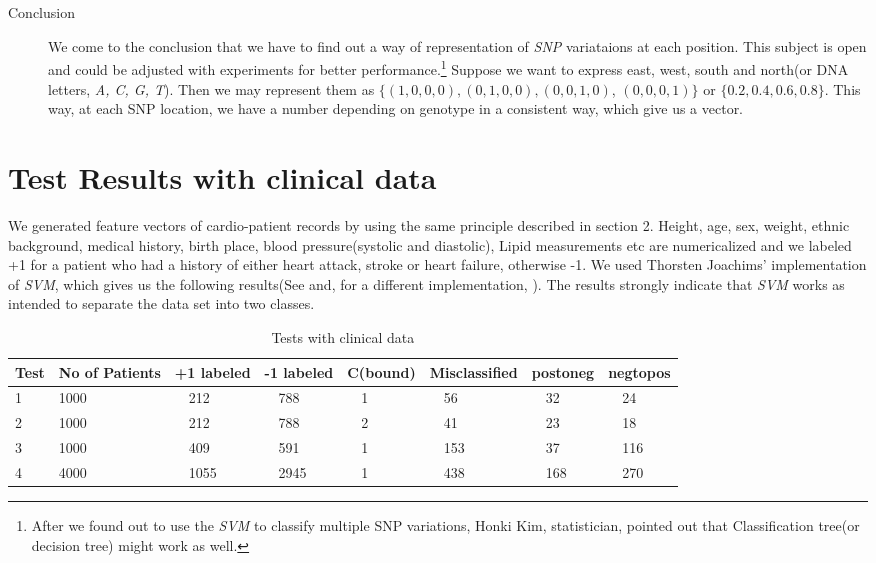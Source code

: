 \documentclass{amsart}%
\theoremstyle{plain}
\numberwithin{equation}{section}
\begin{document}
\hspace{1.5in}
\hspace{1.5in}
\\
\\
\begin{description}
\item[Conclusion]  We come to the conclusion that we have to find out a way
of representation of \emph{SNP} variataions at each position. This subject
is open and could be adjusted with experiments for better performance.\footnote{%
After we found out to use the \emph{SVM} to classify multiple SNP
variations, Honki Kim, statistician, pointed out that Classification tree(or
decision tree) might work as well.} Suppose we want to express
east, west, south and north(or DNA letters, \emph{A, C, G, T}). Then we may
represent them as $\{(1,0,0,0),(0,1,0,0),(0,0,1,0)$, $(0,0,0,1)\}$ or $%
\{0.2,0.4,0.6,0.8\}$. This way, at each SNP location, we have a number
depending on genotype in a consistent way, which give us a vector.
\end{description}

\section{Test Results with clinical data}

We generated feature vectors of cardio-patient records by using the same principle described in section 2.
Height, age, sex, weight, ethnic background, medical
history, birth place, blood pressure(systolic and diastolic), Lipid
measurements etc are numericalized and we labeled +1 for a patient who had a history of either heart attack, stroke or heart failure, otherwise -1.  We used Thorsten Joachims' implementation of \emph{SVM}, which gives us the following results(See \cite{Jo}
and, for a different implementation, \cite{Van}). The results strongly
indicate that \emph{SVM} works as intended to separate the data set into
two classes. 

\begin{table}[tbp]
\begin{center}
\begin{tabular}{|l|l|l|l|l|l|l|l|}
\hline
Test & No of Patients & +1 labeled & -1 labeled & C(bound) & Misclassified
& postoneg & negtopos\\ \hline
1 & 1000 & \ \ 212 & \ \ 788 & \ \ 1 & \ \ 56 & \ \ 32 & \ \ 24\\ 
2 & 1000 & \ \ 212 & \ \ 788 & \ \ 2 & \ \ 41 & \ \  23 & \ \ 18 \\ 
3 & 1000 & \ \ 409 & \ \ 591 & \ \ 1 & \ \ 153 & \ \ 37 & \ \ 116 \\ 
4 & 4000 & \ \ 1055 & \ \ 2945 & \ \ 1 & \ \ 438 & \ \ 168 & \ \ 270\\ \hline
\end{tabular}
\end{center}
\caption{Tests with clinical data}
\label{tb:slopes}
\end{table}
\end{document}
